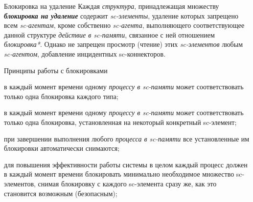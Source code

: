 \begin{frame}{Блокировка на удаление}
  Каждая \textit{структура}, принадлежащая множеству \textbf{\textit{блокировка на удаление}} содержит \textit{sc-элементы}, удаление которых запрещено всем \textit{sc-агентам}, кроме собственно \textit{sc-агента}, выполняющего соответствующее данной структуре \textit{действие в sc-памяти}, связанное с ней отношением \textit{блокировка*}. Однако не запрещен просмотр (чтение) этих \textit{sc-элементов} любым \textit{sc-агентом}, добавление инцидентных sc-коннекторов.  
\end{frame}
    
    
\begin{frame}{Принципы работы с блокировками}
\begin{textitemize}
	\item в каждый момент времени одному \textit{процессу в sc-памяти} может соответствовать только одна блокировка каждого типа;
	\item в каждый момент времени одному \textit{процессу в sc-памяти} может соответствовать только одна блокировка, установленная на некоторый конкретный sc-элемент;
	\item при завершении выполнения любого \textit{процесса в sc-памяти} все установленные им блокировки автоматически снимаются;
	\item для повышения эффективности работы системы в целом каждый процесс должен в каждый момент времени блокировать минимально необходимое множество sc-элементов, снимая блокировку с каждого sc-элемента сразу же, как это становится возможным (безопасным);    
    \end{textitemize}
    \end{frame}
